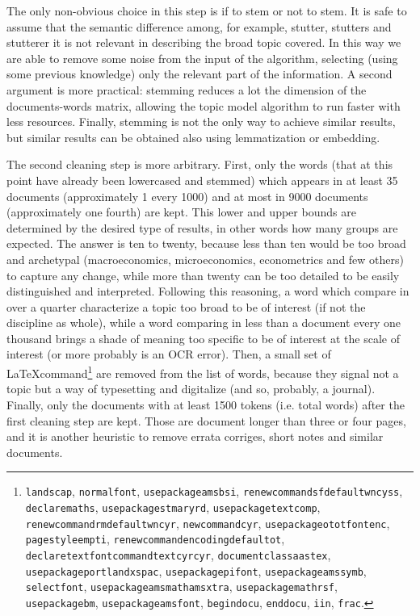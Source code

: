 \documentclass[a4paper, 11pt, headings=standardclasses, tablecaptionsbelow]{scrartcl}
\begin{document}
The only non-obvious choice in this step is if to stem or not to stem. It is safe to assume that the semantic difference among, for example, stutter, stutters and stutterer it is not relevant in describing the broad topic covered. In this way we are able to remove some noise from the input of the algorithm, selecting (using some previous knowledge) only the relevant part of the information. A second argument is more practical: stemming reduces a lot the dimension of the documents-words matrix, allowing the topic model algorithm to run faster with less resources.
Finally, stemming is not the only way to achieve similar results, but similar results can be obtained also using lemmatization or embedding.

The second cleaning step is more arbitrary.
First, only the words (that at this point have already been lowercased and stemmed) which appears in at least 35 documents (approximately 1 every 1000) and at most in 9000 documents (approximately one fourth) are kept. This lower and upper bounds are determined by the desired type of results, in other words how many groups are expected. The answer is ten to twenty, because less than ten would be too broad and archetypal (macroeconomics, microeconomics, econometrics and few others) to capture any change, while more than twenty can be too detailed to be easily distinguished and interpreted. Following this reasoning, a word which compare in over a quarter characterize a topic too broad to be of interest (if not the discipline as whole), while a word comparing in less than a document every one thousand brings a shade of meaning too specific to be of interest at the scale of interest (or more probably is an OCR error). Then, a small set of \LaTeX command\footnote{\texttt{landscap}, \texttt{normalfont}, \texttt{usepackageamsbsi}, \texttt{renewcommandsfdefaultwncyss}, \texttt{declaremaths}, \texttt{usepackagestmaryrd}, \texttt{usepackagetextcomp}, \texttt{renewcommandrmdefaultwncyr}, \texttt{newcommandcyr}, \texttt{usepackageototfontenc}, \texttt{pagestyleempti}, \texttt{renewcommandencodingdefaultot}, \texttt{declaretextfontcommandtextcyrcyr}, \texttt{documentclassaastex}, \texttt{usepackageportlandxspac}, \texttt{usepackagepifont}, \texttt{usepackageamssymb}, \texttt{selectfont}, \texttt{usepackageamsmathamsxtra}, \texttt{usepackagemathrsf}, \texttt{usepackagebm}, \texttt{usepackageamsfont}, \texttt{begindocu}, \texttt{enddocu}, \texttt{iin}, \texttt{frac}.} are removed from the list of words, because they signal not a topic but a way of typesetting and digitalize (and so, probably, a journal).
Finally, only the documents with at least 1500 tokens (i.e. total words) after the first cleaning step are kept. Those are document longer than three or four pages, and it is another heuristic to remove errata corriges, short notes and similar documents.
\end{document}
